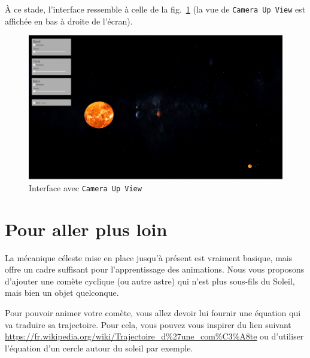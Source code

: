 \documentclass[a4paper,10pt]{article}
\begin{document}
À ce stade, l'interface ressemble à celle de la fig.~\ref{fig:camera-haut} (la vue de \texttt{Camera Up View} est affichée en bas à droite de l'écran).
\begin{figure}[h]
		\begin{center}
			\includegraphics[width=.7\textwidth]{fig/camera-haut}
			\caption{Interface avec \texttt{Camera Up View}}
			\label{fig:camera-haut}
		\end{center}
\end{figure}

\fi 
	

\section{Pour aller plus loin}

La mécanique céleste mise en place jusqu'à présent est vraiment basique, mais offre un cadre suffisant pour l'apprentissage des animations. Nous vous proposons d'ajouter une comète cyclique (ou autre astre) qui n'est plus sous-fils du Soleil, mais bien un objet quelconque.

Pour pouvoir animer votre comète, vous allez devoir lui fournir une équation qui va traduire sa trajectoire. Pour cela, vous pouvez vous inspirer du lien suivant \url{https://fr.wikipedia.org/wiki/Trajectoire_d%27une_com%C3%A8te}
ou d'utiliser l'équation d'un cercle autour du soleil par exemple.
\end{document}
